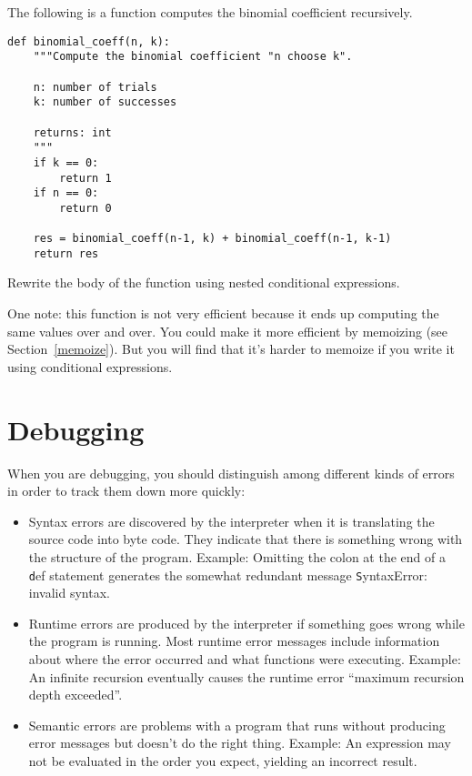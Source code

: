 \documentclass[
DIV=11,
fontsize=12,
twoside,
headinclude=false,
titlepage=firstiscover,
abstract=true,
headsepline=true,
footsepline=true,
chapterprefix=true, %
headings=big,
bibliography=totoc,%
captions=tableheading
]{scrbook}
\theoremstyle{definition}
\begin{document}
\begin{exercise}
\normalfont

The following is a function computes the binomial
coefficient recursively.

\begin{lstlisting}
def binomial_coeff(n, k):
    """Compute the binomial coefficient "n choose k".

    n: number of trials
    k: number of successes

    returns: int
    """
    if k == 0:
        return 1
    if n == 0:
        return 0

    res = binomial_coeff(n-1, k) + binomial_coeff(n-1, k-1)
    return res
\end{lstlisting}

Rewrite the body of the function using nested conditional
expressions.

One note: this function is not very efficient because it ends up computing
the same values over and over.  You could make it more efficient by
memoizing (see Section~\ref{memoize}).  But you will find that it's harder to
memoize if you write it using conditional expressions.

\end{exercise}



\appendix

\chapter{Debugging}

When you are debugging, you should distinguish among different
kinds of errors in order to track them down more quickly:

\begin{itemize}

\item Syntax errors are discovered by the interpreter when it is
  translating the source code into byte code.  They indicate
  that there is something wrong with the structure of the program.
  Example: Omitting the colon at the end of a {\texttt def} statement
  generates the somewhat redundant message {\texttt SyntaxError: invalid
    syntax}.

\item Runtime errors are produced by the interpreter if something goes
  wrong while the program is running.  Most runtime error messages
  include information about where the error occurred and what
  functions were executing.  Example: An infinite recursion eventually
  causes the runtime error ``maximum recursion depth exceeded''.

\item Semantic errors are problems with a program that runs without
  producing error messages but doesn't do the right thing.  Example:
  An expression may not be evaluated in the order you expect, yielding
  an incorrect result.

\end{itemize}
\end{document}
